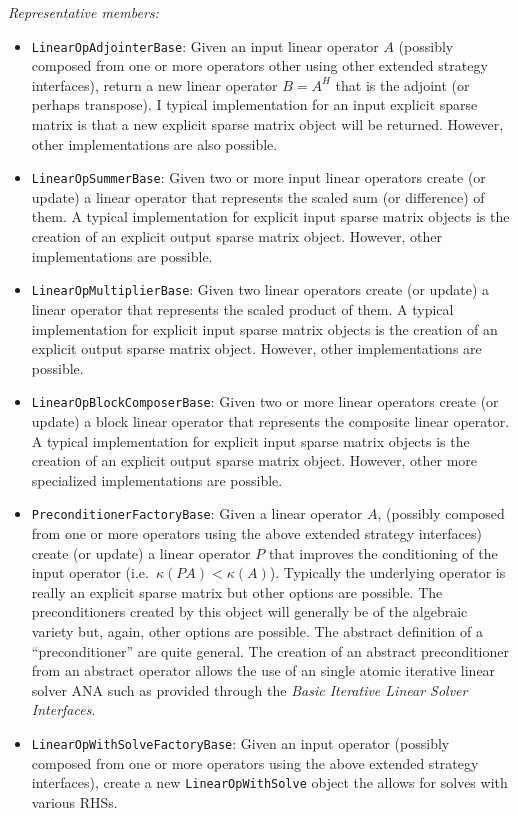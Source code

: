 \documentclass[pdf,ps2pdf,11pt]{SANDreport}
\begin{document}
{}\textit{Representative members:}
\begin{itemize}
%
{}\item {}\texttt{LinearOpAdjointerBase}: Given an input linear operator $A$
(possibly composed from one or more operators other using other extended
strategy interfaces), return a new linear operator $B = A^H$ that is the
adjoint (or perhaps transpose).  I typical implementation for an input
explicit sparse matrix is that a new explicit sparse matrix object will be
returned.  However, other implementations are also possible.
%
{}\item {}\texttt{LinearOpSummerBase}: Given two or more input linear
operators create (or update) a linear operator that represents the scaled sum
(or difference) of them.  A typical implementation for explicit input sparse
matrix objects is the creation of an explicit output sparse matrix object.
However, other implementations are possible.
%
{}\item {}\texttt{LinearOpMultiplierBase}: Given two linear operators create
(or update) a linear operator that represents the scaled product of them.  A
typical implementation for explicit input sparse matrix objects is the
creation of an explicit output sparse matrix object.  However, other
implementations are possible.
%
{}\item {}\texttt{LinearOpBlockComposerBase}: Given two or more linear
operators create (or update) a block linear operator that represents the
composite linear operator.  A typical implementation for explicit input sparse
matrix objects is the creation of an explicit output sparse matrix object.
However, other more specialized implementations are possible.
%
{}\item {}\texttt{PreconditionerFactoryBase}: Given a linear operator $A$,
(possibly composed from one or more operators using the above extended
strategy interfaces) create (or update) a linear operator $P$ that improves
the conditioning of the input operator (i.e.\ $\kappa(P A) < {}\kappa(A)$).
Typically the underlying operator is really an explicit sparse matrix but
other options are possible.  The preconditioners created by this object will
generally be of the algebraic variety but, again, other options are possible.
The abstract definition of a ``preconditioner'' are quite general.  The
creation of an abstract preconditioner from an abstract operator allows the
use of an single atomic iterative linear solver ANA such as provided through
the {}\textit{Basic Iterative Linear Solver Interfaces}.
%
{}\item {}\texttt{LinearOpWithSolveFactoryBase}: Given an input operator
(possibly composed from one or more operators using the above extended
strategy interfaces), create a new {}\texttt{Linear\-Op\-With\-Solve} object
the allows for solves with various RHSs.
%
\end{itemize}
\end{document}
